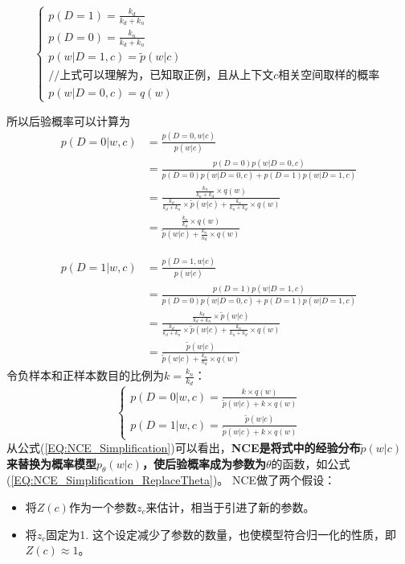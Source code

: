 \documentclass{article}
\begin{document}
\begin{equation}
    \begin{cases}
        p(D=1)=\frac{k_d}{k_d+k_n}\\
        p(D=0)=\frac{k_n}{k_d+k_n}\\
        p(w|D=1,c)=\tilde{p}(w|c) \\
        //\text{上式可以理解为，已知取正例，且从上下文$c$相关空间取样的概率}\\
        p(w|D=0,c)=q(w)
    \end{cases}
\end{equation}

所以后验概率可以计算为
\begin{equation}
    \begin{split}
        p(D=0|w,c)&=\frac{p(D=0,w|c)}{p(w|c)}\\
        &= \frac{p(D=0)p(w|D=0,c)}{p(D=0)p(w|D=0,c)+p(D=1)p(w|D=1,c)}\\
        &= \frac{\frac{k_n}{k_n+k_d} \times q(w)}{\frac{k_d}{k_d+k_n} \times \tilde{p}(w|c) + \frac{k_n}{k_n+k_d} \times q(w)} \\
        &= \frac{\frac{k_n}{k_d} \times q(w)}{\tilde{p}(w|c)+\frac{k_n}{n_d} \times q(w)}
    \end{split}
\end{equation}

\begin{equation}
    \begin{split}
        p(D=1|w,c)&=\frac{p(D=1,w|c)}{p(w|c)}\\
        &= \frac{p(D=1)p(w|D=1,c)}{p(D=0)p(w|D=0,c) + p(D=1)p(w|D=1,c)}\\
        &= \frac{\frac{k_d}{k_d+k_n}\times \tilde{p}(w|c)}{\frac{k_d}{k_d+k_n} \times \tilde{p}(w|c) + \frac{k_n}{k_n+k_d} \times q(w)}\\
        &= \frac{\tilde{p}(w|c)}{\tilde{p}(w|c)+\frac{k_n}{n_d} \times q(w)}
    \end{split}
\end{equation}
令负样本和正样本数目的比例为$k=\frac{k_n}{k_d}$：
\begin{equation}
    \begin{cases}
        p(D=0|w,c)=\frac{k \times q(w)}{\tilde{p}(w|c) + k \times q(w)}\\
        p(D=1|w,c)=\frac{\tilde{p}(w|c)}{\tilde{p}(w|c) + k \times q(w)}
    \end{cases}
    \label{EQ:NCE_Simplification}
\end{equation}
从公式(\ref{EQ:NCE_Simplification})可以看出，\textbf{NCE是将式中的经验分布$\tilde{p}(w|c)$来替换为概率模型$p_\theta(w|c)$，使后验概率成为参数为$\theta$}的函数，如公式(\ref{EQ:NCE_Simplification_ReplaceTheta})。
NCE做了两个假设：
\begin{itemize}
    \item 将$Z(c)$作为一个参数$z_c$来估计，相当于引进了新的参数。
    \item 将$z_c$固定为1. 这个设定减少了参数的数量，也使模型符合归一化的性质，即$Z(c) \approx 1$。
\end{itemize}
\end{document}
